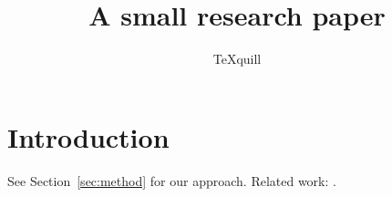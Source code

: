 \documentclass{article}
\title{A small research paper}
\author{TeXquill}
\begin{document}
\maketitle

\section{Introduction}\label{sec:intro}
See Section~\ref{sec:method} for our approach.
Related work: \cite{}.





\end{document}
